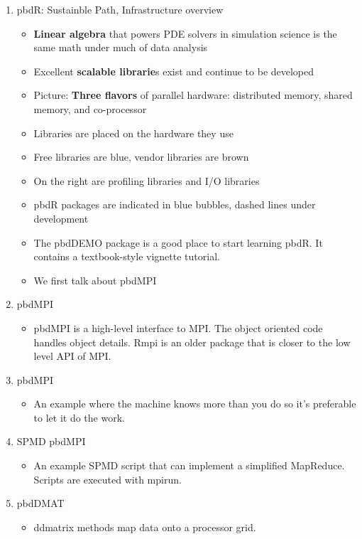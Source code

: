 \documentclass{article}
\begin{document}
\begin{enumerate}
\item pbdR: Sustainble Path, Infrastructure overview
  \begin{itemize}
  \item {\bf Linear algebra} that powers PDE solvers in simulation science
    is the same math under much of data analysis
  \item Excellent {\bf scalable librarie}s exist and continue to be
    developed
  \item Picture: {\bf Three flavors} of parallel hardware: distributed memory,
    shared memory, and co-processor
  \item Libraries are placed on the hardware they use
  \item {\color{blue}Free libraries are blue}, {\color{auburn}vendor libraries are brown}
  \item On the right are profiling libraries and I/O libraries
  \item pbdR packages are indicated in blue bubbles, dashed lines
    under development
  \item The pbdDEMO package is a good place to start learning pbdR. It
    contains a textbook-style vignette tutorial.
  \item We first talk about pbdMPI
  \end{itemize}
\item pbdMPI
  \begin{itemize}
  \item pbdMPI is a high-level interface to MPI. The object oriented
    code handles object details. Rmpi is an older package that is
    closer to the low level API of MPI.
  \end{itemize}
\item pbdMPI
  \begin{itemize}
  \item An example where the machine knows more than you do so it's
    preferable to let it do the work.
  \end{itemize}
\item SPMD pbdMPI
  \begin{itemize}
  \item An example SPMD script that can implement a simplified
    MapReduce. Scripts are executed with mpirun.
  \end{itemize}
\item pbdDMAT
  \begin{itemize}
  \item ddmatrix methods map data onto a processor grid.
  \end{itemize}

\end{enumerate}
\end{document}
